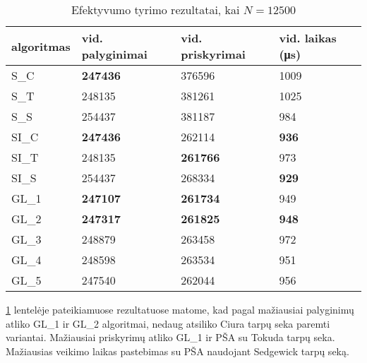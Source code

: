 \documentclass{VUMIFInfKursinis}
\begin{document}
\begin{table}[H]
  \caption{Efektyvumo tyrimo rezultatai, kai $N = 12500$}
  \label{results_12500}
  \centering
  \begin{tabular}{llll}
    algoritmas & vid. palyginimai                        & vid. priskyrimai                        & vid. laikas (μs)                     \\ \midrule
    S\_C       & \cellcolor[HTML]{70AD47}\textbf{247436} & 376596                                  & 1009                                 \\
    S\_T       & 248135                                  & 381261                                  & 1025                                 \\
    S\_S       & 254437                                  & 381187                                  & 984                                  \\
    SI\_C      & \cellcolor[HTML]{70AD47}\textbf{247436} & 262114                                  & \cellcolor[HTML]{70AD47}\textbf{936} \\
    SI\_T      & 248135                                  & \cellcolor[HTML]{70AD47}\textbf{261766} & 973                                  \\
    SI\_S      & 254437                                  & 268334                                  & \cellcolor[HTML]{70AD47}\textbf{929} \\
    GL\_1      & \cellcolor[HTML]{70AD47}\textbf{247107} & \cellcolor[HTML]{70AD47}\textbf{261734} & 949                                  \\
    GL\_2 & \cellcolor[HTML]{70AD47}\textbf{247317} & \cellcolor[HTML]{70AD47}\textbf{261825} & \cellcolor[HTML]{70AD47}\textbf{948} \\
    GL\_3      & 248879                                  & 263458                                  & 972                                  \\
    GL\_4      & 248598                                  & 263534                                  & 951                                  \\
    GL\_5      & 247540                                  & 262044                                  & 956                                  \\ \bottomrule       
  \end{tabular}
\end{table}

\ref{results_12500} lentelėje pateikiamuose rezultatuose matome, kad
pagal mažiausiai palyginimų atliko GL\_1 ir GL\_2 algoritmai, nedaug atsiliko Ciura tarpų seka paremti variantai.
Mažiausiai priskyrimų atliko GL\_1 ir PŠA su Tokuda tarpų seka.
Mažiausias veikimo laikas pastebimas su PŠA naudojant Sedgewick tarpų seką.
\end{document}
